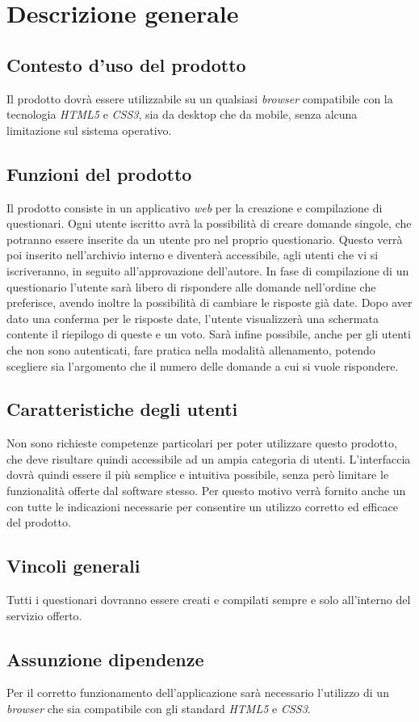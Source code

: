 \newpage
\section{Descrizione generale}
\subsection{Contesto d'uso del prodotto}
Il prodotto dovrà essere utilizzabile su un qualsiasi \textit{browser} compatibile con la tecnologia \textit{HTML5} e \textit{CSS3}, sia da desktop che da mobile, senza alcuna limitazione sul sistema operativo.

\subsection{Funzioni del prodotto}
Il prodotto consiste in un applicativo \textit{web} per la creazione e compilazione di questionari. Ogni utente iscritto avrà la possibilità di creare domande singole, che potranno essere inserite da un utente pro nel proprio questionario. Questo verrà poi inserito nell'archivio interno e diventerà accessibile, agli utenti che vi si iscriveranno, in seguito all'approvazione dell'autore. In fase di compilazione di un questionario l'utente sarà libero di rispondere alle domande nell'ordine che preferisce, avendo inoltre la possibilità di cambiare le risposte già date. Dopo aver dato una conferma per le risposte date, l'utente visualizzerà una schermata contente il riepilogo di queste e un voto. Sarà infine possibile, anche per gli utenti che non sono autenticati, fare pratica nella modalità allenamento, potendo scegliere sia l'argomento che il numero delle domande a cui si vuole rispondere.

\subsection{Caratteristiche degli utenti}
Non sono richieste competenze particolari per poter utilizzare questo prodotto, che deve risultare quindi accessibile ad un ampia categoria di utenti. L'interfaccia dovrà quindi essere il più semplice e intuitiva possibile, senza però limitare le funzionalità offerte dal software stesso. Per questo motivo verrà fornito anche un \textit{\MU} con tutte le indicazioni necessarie per consentire un utilizzo corretto ed efficace del prodotto.
\subsection{Vincoli generali}
Tutti i questionari dovranno essere creati e compilati sempre e solo all'interno del servizio offerto.
\subsection{Assunzione dipendenze}
Per il corretto funzionamento dell'applicazione sarà necessario l'utilizzo di un \textit{browser} che sia compatibile con gli standard \textit{HTML5} e \textit{CSS3}.